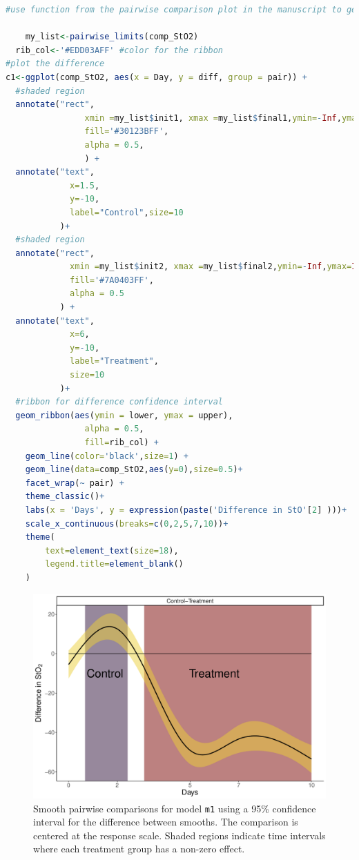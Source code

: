 \documentclass[
]{article}
\newcommand{\passthrough}[1]{#1}
\begin{document}
\begin{lstlisting}[language=R]
#use function from the pairwise comparison plot in the manuscript to get the shaded regions
    
    my_list<-pairwise_limits(comp_StO2)
  rib_col<-'#EDD03AFF' #color for the ribbon
#plot the difference
c1<-ggplot(comp_StO2, aes(x = Day, y = diff, group = pair)) +
  #shaded region
  annotate("rect",
                xmin =my_list$init1, xmax =my_list$final1,ymin=-Inf,ymax=Inf,
                fill='#30123BFF',
                alpha = 0.5,
                ) +
  annotate("text",
             x=1.5,
             y=-10,
             label="Control",size=10
           )+
  #shaded region  
  annotate("rect",
             xmin =my_list$init2, xmax =my_list$final2,ymin=-Inf,ymax=Inf,
             fill='#7A0403FF',
             alpha = 0.5
           ) +
  annotate("text",
             x=6,
             y=-10,
             label="Treatment",
             size=10
           )+
  #ribbon for difference confidence interval  
  geom_ribbon(aes(ymin = lower, ymax = upper),
                alpha = 0.5,
                fill=rib_col) +
    geom_line(color='black',size=1) +
    geom_line(data=comp_StO2,aes(y=0),size=0.5)+
    facet_wrap(~ pair) +
    theme_classic()+
    labs(x = 'Days', y = expression(paste('Difference in StO'[2] )))+
    scale_x_continuous(breaks=c(0,2,5,7,10))+
    theme(
        text=element_text(size=18),
        legend.title=element_blank()
    )
\end{lstlisting}



\begin{figure}[H]

{\centering \includegraphics[width=0.75\linewidth,]{00-Full_document_files/figure-latex/pairwise-comp-workflow-fig-1} 

}

\caption{Smooth pairwise comparisons for model \passthrough{\lstinline!m1!} using a 95\% confidence interval for the difference between smooths. The comparison is centered at the response scale. Shaded regions indicate time intervals where each treatment group has a non-zero effect.}\label{fig:pairwise-comp-workflow-fig}
\end{figure}
\end{document}
